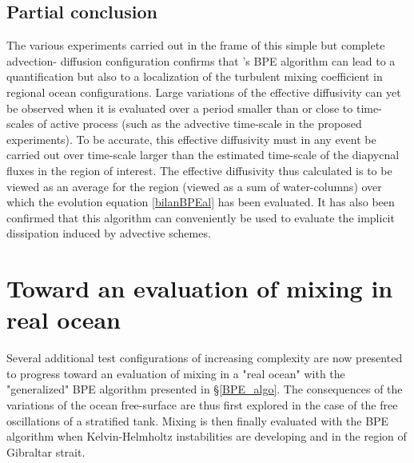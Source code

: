 \subsection{Partial conclusion}
The various experiments carried out in the frame of this simple but complete advection- diffusion configuration confirms that \cite{winters_available_1995}'s BPE algorithm can lead to a quantification but also to a localization of the turbulent mixing coefficient in regional ocean configurations. Large variations of the effective diffusivity can yet be observed when it is evaluated over a period smaller than or close to time-scales of active process (such as the advective time-scale in the proposed experiments). To be accurate, this effective diffusivity must in any event be carried out over time-scale larger than the estimated time-scale of the diapycnal fluxes in the region of interest. The effective diffusivity thus calculated is to be viewed as an average for the region (viewed as a sum of water-columns) over which the evolution equation \ref{bilanBPEal} has been evaluated. It has also been confirmed that this algorithm can conveniently be used to evaluate the implicit dissipation induced by advective schemes.

\section{Toward an evaluation of mixing in real ocean}
\label{section_CROCO_BPE}
Several additional test configurations of increasing complexity are now presented to progress toward an evaluation of mixing in a "real ocean" with the "generalized" BPE algorithm presented in \S \ref{BPE_algo}. The consequences of the variations of the ocean free-surface are thus first explored in the case of the free oscillations of a stratified tank. Mixing is then finally evaluated with the BPE algorithm when Kelvin-Helmholtz instabilities are developing and in the region of Gibraltar strait.

